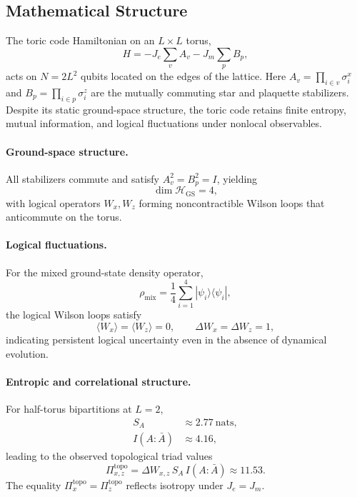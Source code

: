 \documentclass[10pt]{article}
\begin{document}
\subsection*{Mathematical Structure}

The toric code Hamiltonian on an $L \times L$ torus,
\begin{equation}
H = -J_e \sum_v A_v - J_m \sum_p B_p,
\end{equation}
acts on $N = 2L^2$ qubits located on the edges of the lattice. 
Here $A_v = \prod_{i \in v} \sigma^x_i$ and $B_p = \prod_{i \in p} \sigma^z_i$ 
are the mutually commuting star and plaquette stabilizers. 
Despite its static ground-space structure, the toric code retains finite entropy, 
mutual information, and logical fluctuations under nonlocal observables.

\paragraph{Ground-space structure.}
All stabilizers commute and satisfy $A_v^2 = B_p^2 = I$, yielding 
\begin{equation}
\dim \mathcal{H}_{\mathrm{GS}} = 4,
\end{equation}
with logical operators $W_x, W_z$ forming noncontractible Wilson loops that anticommute on the torus.

\paragraph{Logical fluctuations.}
For the mixed ground-state density operator,
\begin{equation}
\rho_{\mathrm{mix}} = \frac{1}{4} \sum_{i=1}^{4} |\psi_i\rangle \langle \psi_i|,
\end{equation}
the logical Wilson loops satisfy
\begin{equation}
\langle W_x \rangle = \langle W_z \rangle = 0, 
\qquad 
\Delta W_x = \Delta W_z = 1,
\end{equation}
indicating persistent logical uncertainty even in the absence of dynamical evolution.

\paragraph{Entropic and correlational structure.}
For half-torus bipartitions at $L=2$,
\begin{align}
S_A &\approx 2.77~\text{nats}, \\
I(A:\bar{A}) &\approx 4.16,
\end{align}
leading to the observed topological triad values
\begin{equation}
\Pi^{\mathrm{topo}}_{x,z} 
  = \Delta W_{x,z} \, S_A \, I(A:\bar{A})
  \approx 11.53.
\end{equation}
The equality $\Pi^{\mathrm{topo}}_x = \Pi^{\mathrm{topo}}_z$ reflects isotropy under $J_e=J_m$.
\end{document}
